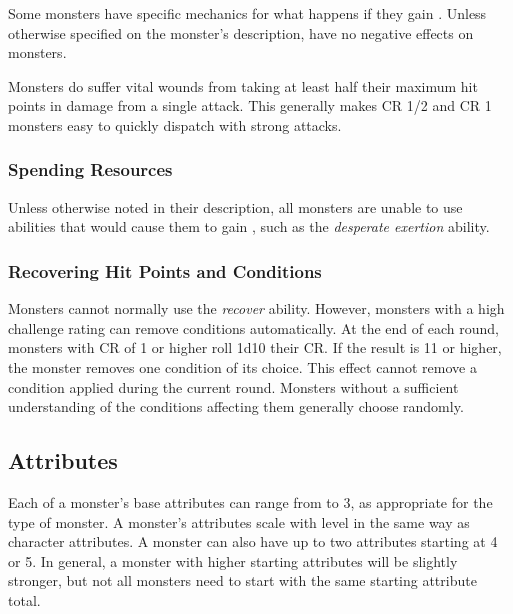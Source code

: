             Some monsters have specific mechanics for what happens if they gain .
            Unless otherwise specified on the monster's description,  have no negative effects on monsters.

            Monsters do suffer vital wounds from taking at least half their maximum hit points in damage from a single attack.
            This generally makes CR 1/2 and CR 1 monsters easy to quickly dispatch with strong attacks.

        \subsubsection{Spending Resources}
            Unless otherwise noted in their description, all monsters are unable to use abilities that would cause them to gain , such as the \textit{desperate exertion} ability.

        \subsubsection{Recovering Hit Points and Conditions}
            Monsters cannot normally use the \textit{recover} ability.
            However, monsters with a high challenge rating can remove conditions automatically.
            At the end of each round, monsters with CR of 1 or higher roll 1d10 \add their CR.
            If the result is 11 or higher, the monster removes one condition of its choice.
            This effect cannot remove a condition applied during the current round.
            Monsters without a sufficient understanding of the conditions affecting them generally choose randomly.

    \subsection{Attributes}
        Each of a monster's base attributes can range from  to 3, as appropriate for the type of monster.
        A monster's attributes scale with level in the same way as character attributes.
        A monster can also have up to two attributes starting at 4 or 5.
        In general, a monster with higher starting attributes will be slightly stronger, but not all monsters need to start with the same starting attribute total.

